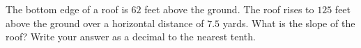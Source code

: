 The bottom edge of a roof is $62$ feet above the ground. The roof rises to $125$ feet above the ground over a horizontal distance of $7.5$ yards. What is the slope of the roof? Write your answer as a decimal to the nearest tenth.
